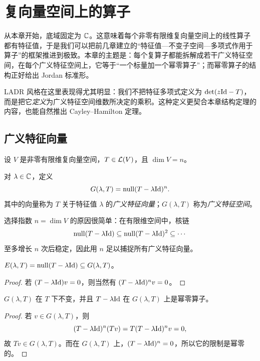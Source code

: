 \chapter{复向量空间上的算子}

从本章开始，底域固定为 $\mathbb{C}$。这意味着每个非零有限维复向量空间上的线性算子都有特征值，于是我们可以把前几章建立的“特征值—不变子空间—多项式作用于算子”的框架推进到极致。本章的主题是：每个复算子都能拆解成若干广义特征空间，在每个广义特征空间上，它等于“一个标量加一个幂零算子”；而幂零算子的结构正好给出 Jordan 标准形。

LADR 风格在这里表现得尤其明显：我们不把特征多项式定义为 $\det(z\mathrm{Id}-T)$，而是把它\emph{定义}为广义特征空间维数所决定的乘积。这种定义更契合本章结构定理的内容，也能自然推出 Cayley--Hamilton 定理。

\section{广义特征向量}

设 $V$ 是非零有限维复向量空间，$T\in\mathcal{L}(V)$，且 $\dim V=n$。

\begin{definition}
对 $\lambda\in\mathbb{C}$，定义
\[
G(\lambda,T)=\mathrm{null}(T-\lambda\mathrm{Id})^n.
\]
其中的向量称为 $T$ 关于特征值 $\lambda$ 的\emph{广义特征向量}；$G(\lambda,T)$ 称为\emph{广义特征空间}。
\end{definition}

选择指数 $n=\dim V$ 的原因很简单：在有限维空间中，核链
\[
\mathrm{null}(T-\lambda\mathrm{Id})\subseteq \mathrm{null}(T-\lambda\mathrm{Id})^2\subseteq\cdots
\]
至多增长 $n$ 次后稳定，因此用 $n$ 足以捕捉所有广义特征向量。

\begin{proposition}
$E(\lambda,T)=\mathrm{null}(T-\lambda\mathrm{Id})\subseteq G(\lambda,T)$。
\end{proposition}

\begin{proof}
若 $(T-\lambda\mathrm{Id})v=0$，则当然有 $(T-\lambda\mathrm{Id})^nv=0$。
\end{proof}

\begin{proposition}
$G(\lambda,T)$ 在 $T$ 下不变，并且 $T-\lambda\mathrm{Id}$ 在 $G(\lambda,T)$ 上是幂零算子。
\end{proposition}

\begin{proof}
若 $v\in G(\lambda,T)$，则
\[
(T-\lambda\mathrm{Id})^n(Tv)=T(T-\lambda\mathrm{Id})^nv=0,
\]
故 $Tv\in G(\lambda,T)$。而在 $G(\lambda,T)$ 上，$(T-\lambda\mathrm{Id})^n=0$，所以它的限制是幂零的。
\end{proof}

